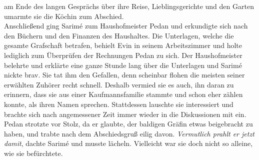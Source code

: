 am Ende des langen Gesprächs über ihre Reise, Lieblingsgerichte und den Garten umarmte sie die 
Köchin zum Abschied.\\
Anschließend ging Sarimé zum Haushofmeister Pedan und erkundigte sich nach den Büchern und den 
Finanzen des Haushaltes. Die Unterlagen, welche die gesamte Grafschaft betrafen, behielt Evin in 
seinem Arbeitszimmer und holte lediglich zum Überprüfen der Rechnungen Pedan zu sich. Der 
Haushofmeister belehrte und erklärte eine ganze Stunde lang über die Unterlagen und Sarimé nickte 
brav. Sie tat ihm den Gefallen, denn scheinbar flohen die meisten seiner erwählten Zuhörer recht 
schnell. Deshalb vermied sie es auch, ihn daran zu erinnern, dass sie aus einer Kaufmannsfamilie 
stammte und schon eher zählen konnte, als ihren Namen sprechen. Stattdessen lauschte sie 
interessiert und brachte sich nach angemessener Zeit immer wieder in die Diskussionen mit ein. 
Pedan strotzte vor Stolz, da er glaubte, der baldigen Gräfin etwas beigebracht zu haben, und trabte 
nach dem Abschiedsgruß eilig davon.
\textit{Vermutlich prahlt er jetzt damit}, dachte Sarimé und musste lächeln. Vielleicht war sie 
doch nicht so alleine, wie sie befürchtete. \\

